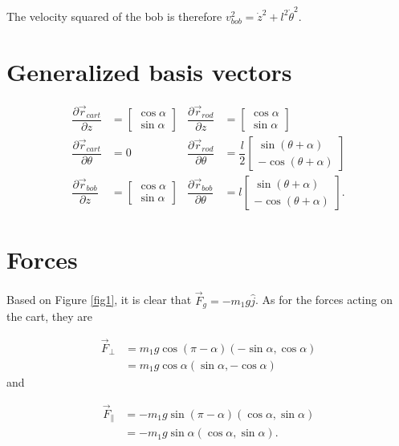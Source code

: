\documentclass[12pt,a4paper,portrait]{article}
\begin{document}
	The velocity squared of the bob is therefore $v_{bob}^2 = \dot{z}^2 + l^2 \dot{\theta}^2$.
	
	\section{Generalized basis vectors}
	\begin{align*}
		\dfrac{\partial \vec{r}_{cart}}{\partial z} &= \begin{bmatrix}
			\cos{\alpha} \\
			\sin{\alpha}
		\end{bmatrix} & \dfrac{\partial \vec{r}_{rod}}{\partial z} &= \begin{bmatrix}
		\cos{\alpha}\\
		\sin{\alpha}
		\end{bmatrix}\\
		\dfrac{\partial \vec{r}_{cart}}{\partial \theta} &= 0 & \dfrac{\partial \vec{r}_{rod}}{\partial \theta} &= \dfrac{l}{2}\begin{bmatrix}
			\sin{(\theta+\alpha)} \\
			-\cos{(\theta+\alpha)}
		\end{bmatrix}\\
		\dfrac{\partial \vec{r}_{bob}}{\partial z} &= \begin{bmatrix}
			\cos{\alpha} \\
			\sin{\alpha}
		\end{bmatrix} & \dfrac{\partial \vec{r}_{bob}}{\partial \theta} &= l\begin{bmatrix}
		\sin{(\theta+\alpha)} \\
		-\cos{(\theta+\alpha)}
		\end{bmatrix}.
	\end{align*}
	\section{Forces}
	Based on Figure \ref{fig1}, it is clear that $\vec{F}_g = -m_1g\hat{j}$.
	As for the forces acting on the cart, they are
	
	\begin{align*}
		\vec{F}_{\perp} &= m_1g\cos{(\pi-\alpha)}(-\sin{\alpha}, \cos{\alpha}) \\
		&= m_1g\cos{\alpha}(\sin{\alpha}, -\cos{\alpha})
	\end{align*}
	and
	
	\begin{align*}
		\vec{F}_{\parallel} &= -m_1g\sin{(\pi-\alpha)}(\cos{\alpha}, \sin{\alpha})\\
		&=- m_1g\sin{\alpha}(\cos{\alpha},\sin{\alpha}).
	\end{align*}
	
\end{document}
